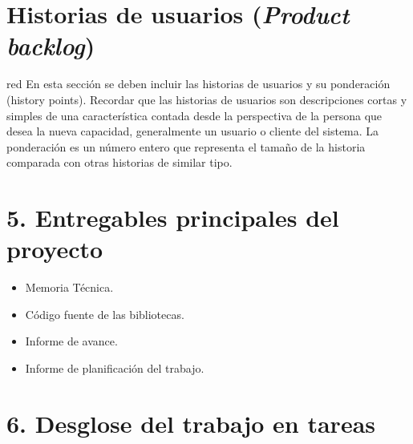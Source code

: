 \documentclass[11pt]{charter}
\begin{document}
\section{Historias de usuarios (\textit{Product backlog})}
\label{sec:backlog}

\begin{consigna}{red}
En esta sección se deben incluir las historias de usuarios y su ponderación (history points). Recordar que las historias de usuarios son descripciones cortas y simples de una característica contada desde la perspectiva de la persona que desea la nueva capacidad, generalmente un usuario o cliente del sistema. La ponderación es un número entero que representa el tamaño de la historia comparada con otras historias de similar tipo.
\end{consigna}

\section{5. Entregables principales del proyecto}
\label{sec:entregables}

\begin{itemize}
\item Memoria Técnica.
\item Código fuente de las bibliotecas.
\item Informe de avance.
\item Informe de planificación del trabajo.
\end{itemize}

\section{6. Desglose del trabajo en tareas}
\label{sec:wbs}

\vspace{25px}
\end{document}

